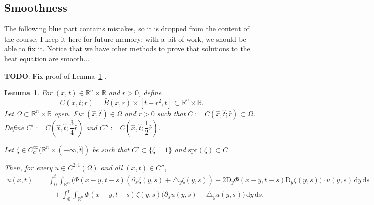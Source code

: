 \documentclass[a4paper,9pt]{amsart}
\newcommand{\R}{\mathbb{R}}	%
\newcommand{\did}{\,\mathrm{d}}	%
\newcommand{\de}{\partial}		%
\newcommand{\Diff}{\mathrm{D}}
\newcommand{\spt}{\mathrm{spt}}
\newcommand{\laplacian}{\triangle}
\newcommand{\TODO}{{\bf\color{Red}TODO}}
\theoremstyle{plain}
\newtheorem{lemma}[proposition]{Lemma}
\theoremstyle{definition}
\theoremstyle{remark}
\begin{document}
\subsection{Smoothness}\label{subs67cc46da}
{\color{blue}

The following blue part contains mistakes, so it is dropped from the content of the course.
I keep it here for future memory: with a bit of work, we should be able to fix it.
Notice that we have other methods to prove that solutions to the heat equation are smooth...

\TODO: Fix proof of Lemma~\ref{lem67cc828c} .


\begin{lemma}\label{lem67cc828c}
	For $(x,t)\in\R^n\times\R$ and $r>0$, define
	\begin{equation}
		C(x,t;r) = \bar B(x,r)\times [t-r^2,t] \subset\R^n\times\R .
	\end{equation}
	Let $\Omega\subset\R^n\times\R$ open.
	Fix $(\hat x,\hat t)\in \Omega$ and $\hat r>0$ such that $C:= C(\hat x,\hat t;\hat r)\subset \Omega$.
	Define $C':= C(\hat x,\hat t;\dfrac{3}{4} \hat r)$
	and $C'' := C(\hat x,\hat t;\dfrac{1}{2} \hat r)$.

	Let $\zeta\in C^\infty_c(\R^n\times(-\infty,\hat t])$ be such that
	$C' \subset \{\zeta = 1\}$ and 
	$\spt(\zeta)\subset C$.
	
	Then, for every $u\in C^{2;1}(\Omega)$ and all $(x,t)\in C''$,
	\begin{equation}
	\begin{aligned}
		u(x,t) 
		&= \int_0^t\int_{\R^n} \bigg( \Phi(x-y,t-s) (\de_s\zeta(y,s)+\laplacian_y\zeta(y,s) )
			+ 2\Diff_y \Phi(x-y,t-s) \Diff_y\zeta(y,s) \bigg) \cdot u(y,s) \did y\did s \\
		&\qquad+ \int_0^t\int_{\R^n} \Phi(x-y,t-s) \zeta(y,s) \bigg(\de_su(y,s) - \laplacian_y u(y,s)\bigg) \did y\did s .
	\end{aligned}
	\end{equation}
\end{lemma}
\begin{center}
\end{center}}
\end{document}
